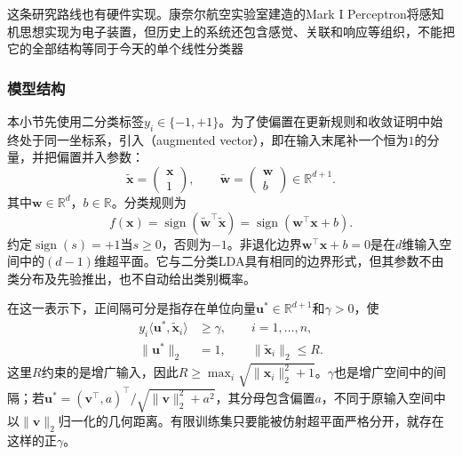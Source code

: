 这条研究路线也有硬件实现。康奈尔航空实验室建造的Mark I Perceptron将感知机思想实现为电子装置，但历史上的系统还包含感觉、关联和响应等组织，不能把它的全部结构等同于今天的单个线性分类器

\subsubsection{模型结构}
\label{sec:classification-perceptron-model}

本小节先使用二分类标签$y_i\in\{-1,+1\}$。为了使偏置在更新规则和收敛证明中始终处于同一坐标系，引入（augmented vector），即在输入末尾补一个恒为$1$的分量，并把偏置并入参数：
\begin{equation}
  \label{eq:classification-perceptron-augmented}
  \tilde{\bm{x}}=
    \begin{pmatrix}\bm{x}\\1\end{pmatrix},\qquad
  \tilde{\bm{w}}=
    \begin{pmatrix}\bm{w}\\b\end{pmatrix}
    \in\mathbb{R}^{d+1}.
\end{equation}
其中$\bm{w}\in\mathbb{R}^{d}$，$b\in\mathbb{R}$。分类规则为
\begin{equation}
  \label{eq:classification-perceptron-prediction}
  f(\bm{x})=\operatorname{sign}
    (\tilde{\bm{w}}^{\top}\tilde{\bm{x}})
    =\operatorname{sign}(\bm{w}^{\top}\bm{x}+b).
\end{equation}
约定$\operatorname{sign}(s)=+1$当$s\geq0$，否则为$-1$。非退化边界$\bm{w}^{\top}\bm{x}+b=0$是在$d$维输入空间中的$(d-1)$维超平面。它与二分类LDA具有相同的边界形式，但其参数不由类分布及先验推出，也不自动给出类别概率。

在这一表示下，正间隔可分是指存在单位向量$\bm{u}^\ast\in\mathbb{R}^{d+1}$和$\gamma>0$，使
\begin{equation}
  \label{eq:classification-perceptron-margin}
  \begin{aligned}
    y_i\langle\bm{u}^\ast,\tilde{\bm{x}}_i\rangle
      &\geq\gamma,\qquad i=1,\ldots,n,\\
    \|\bm{u}^\ast\|_2&=1,\qquad
    \|\tilde{\bm{x}}_i\|_2\leq R .
  \end{aligned}
\end{equation}
这里$R$约束的是增广输入，因此$R\geq\max_i\sqrt{\|\bm{x}_i\|_2^2+1}$。$\gamma$也是增广空间中的间隔；若$\bm{u}^\ast=(\bm{v}^{\top},a)^{\top}/\sqrt{\|\bm{v}\|_2^2+a^2}$，其分母包含偏置$a$，不同于原输入空间中以$\|\bm{v}\|_2$归一化的几何距离。有限训练集只要能被仿射超平面严格分开，就存在这样的正$\gamma$。

